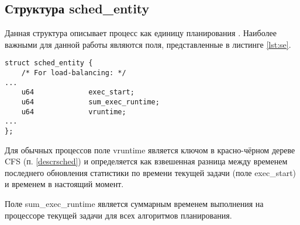 \subsection{Структура sched\_entity}
Данная структура описывает процесс как единицу планирования \cite{bib:3}. Наиболее важными для данной работы являются поля, представленные в листинге \ref{lst:se}. 

\begin{lstlisting}[label=lst:se,caption=Структура sched\_entity. ]
struct sched_entity {
	/* For load-balancing: */
...
	u64				exec_start;
	u64				sum_exec_runtime;
	u64				vruntime;
...
};
\end{lstlisting}

Для обычных процессов поле vruntime является ключом в красно-чёрном дереве CFS (п. \ref{descrsched}) и определяется как взвешенная разница между временем последнего обновления статистики по времени текущей задачи (поле exec\_start) и временем в настоящий момент.

Поле sum\_exec\_runtime является суммарным временем выполнения на процессоре текущей задачи для всех алгоритмов планирования. 








